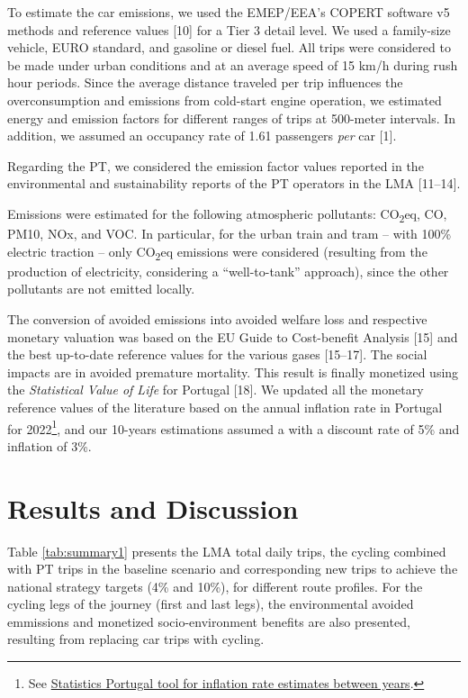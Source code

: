 \documentclass[runningheads]{llncs}
\begin{document}
To estimate the car emissions, we used the EMEP/EEA's COPERT software v5
methods and reference values {[}10{]} for a Tier 3 detail level. We used
a family-size vehicle, EURO standard, and gasoline or diesel fuel. All
trips were considered to be made under urban conditions and at an
average speed of 15 km/h during rush hour periods. Since the average
distance traveled per trip influences the overconsumption and emissions
from cold-start engine operation, we estimated energy and emission
factors for different ranges of trips at 500-meter intervals. In
addition, we assumed an occupancy rate of 1.61 passengers \emph{per} car
{[}1{]}.

Regarding the PT, we considered the emission factor values reported in
the environmental and sustainability reports of the PT operators in the
LMA {[}11--14{]}.

Emissions were estimated for the following atmospheric pollutants:
CO\textsubscript{2}eq, CO, PM10, NOx, and VOC. In particular, for the
urban train and tram -- with 100\% electric traction -- only
CO\textsubscript{2}eq emissions were considered (resulting from the
production of electricity, considering a ``well-to-tank'' approach),
since the other pollutants are not emitted locally.

The conversion of avoided emissions into avoided welfare loss and
respective monetary valuation was based on the EU Guide to Cost-benefit
Analysis {[}15{]} and the best up-to-date reference values for the
various gases {[}15--17{]}. The social impacts are in avoided premature
mortality. This result is finally monetized using the \emph{Statistical
Value of Life} for Portugal {[}18{]}. We updated all the monetary
reference values of the literature based on the annual inflation rate in
Portugal for 2022\footnote{See
  \href{https://www.ine.pt/xportal/xmain?xpid=INE\&xpgid=ipc}{Statistics
  Portugal tool for inflation rate estimates between years}.}, and our
10-years estimations assumed a with a discount rate of 5\% and inflation
of 3\%.

\hypertarget{results-and-discussion}{%
\section{Results and Discussion}\label{results-and-discussion}}

Table \ref{tab:summary1} presents the LMA total daily trips, the cycling
combined with PT trips in the baseline scenario and corresponding new
trips to achieve the national strategy targets (4\% and 10\%), for
different route profiles. For the cycling legs of the journey (first and
last legs), the environmental avoided emmissions and monetized
socio-environment benefits are also presented, resulting from replacing
car trips with cycling.
\end{document}
